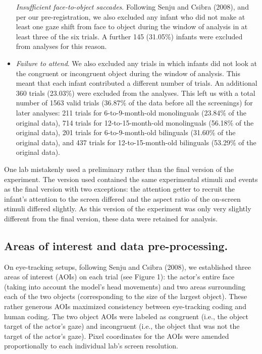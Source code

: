 \documentclass[,man,floatsintext]{apa6}
\begin{document}
\begin{itemize}
  \emph{Insufficient face-to-object saccades}. Following Senju and Csibra (2008), and per our pre-registration, we also excluded any infant who did not make at least one gaze shift from face to object during the window of analysis in at least three of the six trials. A further 145 (31.05\%) infants were excluded from analyses for this reason.
\item
  \emph{Failure to attend}. We also excluded any trials in which infants did not look at the congruent or incongruent object during the window of analysis. This meant that each infant contributed a different number of trials. An additional 360 trials (23.03\%) were excluded from the analyses. This left us with a total number of 1563 valid trials (36.87\% of the data before all the screenings) for later analyses: 211 trials for 6-to-9-month-old monolinguals (23.84\% of the original data), 714 trials for 12-to-15-month-old monolinguals (56.18\% of the original data), 201 trials for 6-to-9-month-old bilinguals (31.60\% of the original data), and 437 trials for 12-to-15-month-old bilinguals (53.29\% of the original data).
\end{itemize}

One lab mistakenly used a preliminary rather than the final version of the experiment. The version used contained the same experimental stimuli and events as the final version with two exceptions: the attention getter to recruit the infant's attention to the screen differed and the aspect ratio of the on-screen stimuli differed slightly. As this version of the experiment was only very slightly different from the final version, these data were retained for analysis.

\hypertarget{areas-of-interest-and-data-pre-processing.}{%
\subsection{Areas of interest and data pre-processing.}\label{areas-of-interest-and-data-pre-processing.}}

On eye-tracking setups, following Senju and Csibra (2008), we established three areas of interest (AOIs) on each trial (see Figure 1): the actor's entire face (taking into account the model's head movements) and two areas surrounding each of the two objects (corresponding to the size of the largest object). These rather generous AOIs maximized consistency between eye-tracking coding and human coding. The two object AOIs were labeled as congruent (i.e., the object target of the actor's gaze) and incongruent (i.e., the object that was not the target of the actor's gaze). Pixel coordinates for the AOIs were amended proportionally to each individual lab's screen resolution.
\end{document}

